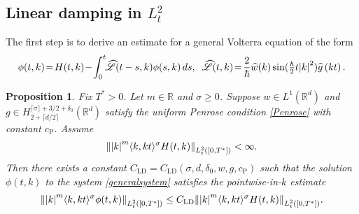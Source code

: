 \documentclass[JEP,XML,SOM,Unicode]{cedram}
\theoremstyle{plain}
\newtheorem{proposition}[theorem]{Proposition}
\theoremstyle{remark}
\newcommand{\br}[1]{\left(#1\right)}
\newcommand{\ak}{\abs{k}}
\newcommand{\jb}[1]{\langle#1\rangle}
\newcommand{\mytextfrac}[2]{{\textstyle\frac{#1}{#2}}}
\newcommand{\R}{\mathbb{R}}
\newcommand{\ceils}[1]{\lceil#1\rceil}
\begin{document}
\subsection{Linear damping in $L^2_t$} The first step is to derive an estimate for a general Volterra equation of the form
\begin{align}\label{generalsystem}
\phi(t,k)\!=\!H(t,k)\!-\!\int_0^t\hspace*{-1mm}\widehat {\mathscr L}(t-s,k)\phi(s,k)\,ds,\;\; \widehat {\mathscr L}(t,k)\!=\!\frac{2}{\hbar}\widehat w(k)\sin (\mytextfrac{\hbar}{2} t\ak^2)\widehat g\br{kt}.
\end{align}
\begin{proposition}\label{linearquantumdampingproposition}
Fix $T^*>0$.
Let $m\in\R$ and $\sigma\geq0$. Suppose $w\in L^1(\R^d)$ and $g\in H^{\ceils{\sigma}+3/2+\delta_0}_{2+\ceils{d/2}}(\R^d)$ satisfy the uniform Penrose condition \eqref{Penrose} with constant ${c_{\mathrm{P}}}$. Assume
\begin{align*}
\norm{\ak^m\jb{k,kt}^\sigma H(t,k)}_{L^2_{t}([0,T^*])}<\infty.
\end{align*}
Then there exists a constant $C_{\mathrm{LD}}=C_{\mathrm{LD}}(\sigma,d,\delta_0,w,g,{c_{\mathrm{P}}})$ such that the solution $\phi(t,k)$ to the system \eqref{generalsystem} satisfies the pointwise-in-$k$ estimate
\begin{align*}
\norm{\ak^m\jb{k,kt}^\sigma\phi(t,k)}_{L^2_{t}([0,T^*])}\leq C_{\mathrm{LD}}\norm{\ak^m\jb{k,kt}^\sigma H(t,k)}_{L^2_t([0,T^*])}.
\end{align*}
\end{proposition}
\end{document}
